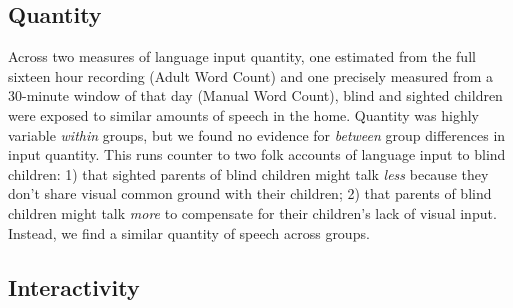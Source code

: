 \documentclass[
  man,floatsintext]{apa6}
\begin{document}
\hypertarget{quantity-1}{%
\subsection{Quantity}\label{quantity-1}}

Across two measures of language input quantity, one estimated from the full sixteen hour recording (Adult Word Count) and one precisely measured from a 30-minute window of that day (Manual Word Count), blind and sighted children were exposed to similar amounts of speech in the home. Quantity was highly variable \emph{within} groups, but we found no evidence for \emph{between} group differences in input quantity. This runs counter to two folk accounts of language input to blind children: 1) that sighted parents of blind children might talk \emph{less} because they don't share visual common ground with their children; 2) that parents of blind children might talk \emph{more} to compensate for their children's lack of visual input. Instead, we find a similar quantity of speech across groups.

\hypertarget{interactivity-2}{%
\subsection{Interactivity}\label{interactivity-2}}
\end{document}
